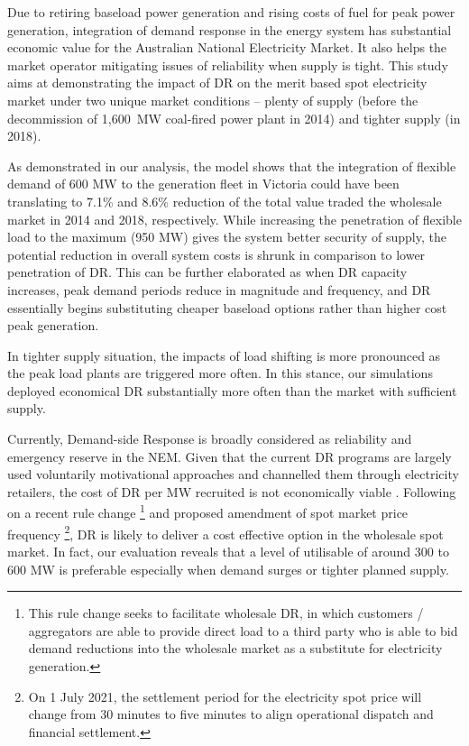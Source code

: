 \documentclass{pasa}%
\begin{document}
Due to retiring baseload power generation and rising costs of fuel for peak power generation, integration of demand response in the energy system has substantial economic value for the Australian National Electricity Market. It also helps the market operator mitigating issues of reliability when supply is tight. This study aims at demonstrating the impact of DR on the merit based spot electricity market under two unique market conditions -- plenty of supply (before the decommission of 1,600~MW coal-fired power plant in 2014) and tighter supply (in 2018).  

As demonstrated in our analysis, the model shows that the integration of flexible demand of 600 MW to the generation fleet in Victoria could have been translating to 7.1\% and 8.6\% reduction of the total value traded the wholesale market in 2014 and 2018, respectively. While increasing the penetration of flexible load to the maximum (950 MW) gives the system better security of supply, the potential reduction in overall system costs is shrunk in comparison to lower penetration of DR. This can be further elaborated as when DR capacity increases, peak demand periods reduce in magnitude and frequency, and DR essentially begins substituting cheaper baseload options rather than higher cost peak generation.

In tighter supply situation, the impacts of load shifting is more pronounced as the peak load plants are triggered more often. In this stance, our simulations deployed economical DR substantially more often than the market with sufficient supply.

Currently, Demand-side Response is broadly considered as reliability and emergency reserve in the NEM. Given that the current DR programs are largely used voluntarily motivational approaches and channelled them through electricity retailers, the cost of DR per MW recruited is not economically viable \cite{oakley2019}. Following on a recent rule change \footnote{This rule change seeks to facilitate wholesale DR, in which customers / aggregators are able to provide direct load to a third party who is able to bid demand reductions into the wholesale market as a substitute for electricity generation.} and proposed amendment of spot market price frequency \footnote{On 1 July 2021, the settlement period for the electricity spot price will change from 30 minutes to five minutes to align operational dispatch and financial settlement.}, DR is likely to deliver a cost effective option in the wholesale spot market. In fact, our evaluation reveals that a level of utilisable of around 300 to 600 MW is preferable especially when demand surges or tighter planned supply.
\end{document}
